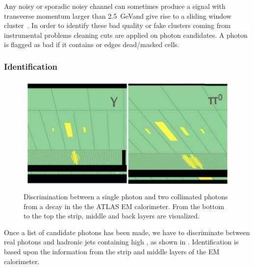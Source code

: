 
Any noisy or sporadic noisy channel can sometimes produce a signal with transverse momentum larger than \SI{2.5}{\GeV }and give rise to a sliding window cluster~\cite{photons}. In order to identify these bad quality or fake clusters coming from instrumental problems cleaning cuts are applied on photon candidates. A photon is flagged as bad if it contains or edges dead/masked cells.

\subsubsection{Identification}
\begin{figure}[tp]
\centering
\includegraphics[width=.65\textwidth]{MCSample/pizerogamma}
\caption{Discrimination between a single photon and two collimated photons from a \pizero decay in the the ATLAS EM calorimeter. From the bottom to the top the strip, middle and back layers are visualized.}
\label{pizerogamma}
\end{figure}

Once a list of candidate photons has been made, we have to discriminate between real photons and hadronic jets containing high \pt \pizero, as shown in \Fig{\ref{pizerogamma}}. Identification is based upon the information from the strip and middle layers of the EM calorimeter.

